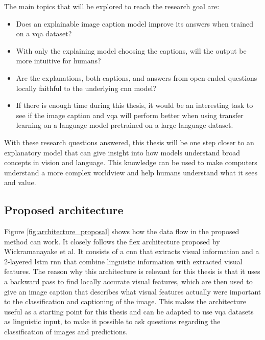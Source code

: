 The main topics that will be explored to reach the research goal are: 
\begin{itemize}
    \item Does an explainable image caption model improve its answers when trained on a \gls{vqa} dataset?
    \item With only the explaining model choosing the captions, will the output be more intuitive for humans?
    \item Are the explanations, both captions, and answers from open-ended questions locally faithful to the underlying \gls{cnn} model?
    \item If there is enough time during this thesis, it would be an interesting task to see if the image caption and \gls{vqa} will perform better when using transfer learning  on a language model pretrained on a large language dataset. 
\end{itemize}

With these research questions answered, this thesis will be one step closer to an explanatory model that can give insight into how models understand broad concepts in vision and language. This knowledge can be used to make computers understand a more complex worldview and help humans understand what it sees and value.

\subsection{Proposed architecture}
Figure \ref{fig:architecture_proposal} shows how the data flow in the proposed method can work. It closely follows the \gls{flex} \cite{wickramanayakeFLEXFaithfulLinguistic2019} architecture proposed by Wickramanayake et al. It consists of a \gls{cnn} that extracts visual information and a 2-layered \gls{lstm} \cite{hochreiterLongShorttermMemory1997} \gls{rnn} that combine linguistic information with extracted visual features. The reason why this architecture is relevant for this thesis is that it uses a backward pass to find locally accurate visual features, which are then used to give an image caption that describes what visual features actually were important to the classification and captioning of the image. This makes the architecture useful as a starting point for this thesis and can be adapted to use \gls{vqa} datasets as linguistic input, to make it possible to ask questions regarding the classification of images and predictions. 

